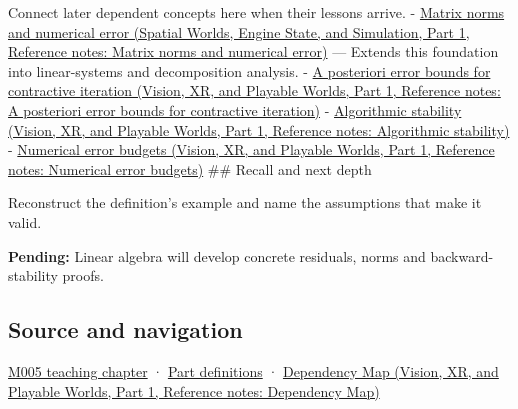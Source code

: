\hypertarget{appendix-a7fbaf6d1b1c-used-by}{}

Connect later dependent concepts here when their lessons arrive. - \href{../05-Spatial-Worlds-Engine-State-and-Simulation-P01/main.pdf\#nameddest=appendix-f8657bac66e5}{Matrix norms and numerical error (Spatial Worlds, Engine State, and Simulation, Part 1, Reference notes: Matrix norms and numerical error)} --- Extends this foundation into linear-systems and decomposition analysis. - \href{../07-Vision-XR-and-Playable-Worlds-P01/main.pdf\#nameddest=appendix-d83b0ad1be7f}{A posteriori error bounds for contractive iteration (Vision, XR, and Playable Worlds, Part 1, Reference notes: A posteriori error bounds for contractive iteration)} - \href{../07-Vision-XR-and-Playable-Worlds-P01/main.pdf\#nameddest=appendix-aa2bf0d79639}{Algorithmic stability (Vision, XR, and Playable Worlds, Part 1, Reference notes: Algorithmic stability)} - \href{../07-Vision-XR-and-Playable-Worlds-P01/main.pdf\#nameddest=appendix-31b8c295e05f}{Numerical error budgets (Vision, XR, and Playable Worlds, Part 1, Reference notes: Numerical error budgets)} \#\# Recall and next depth

Reconstruct the definition's example and name the assumptions that make it valid.

\textbf{Pending:} Linear algebra will develop concrete residuals, norms and backward-stability proofs.

\subsection{Source and navigation}\label{appendix-a7fbaf6d1b1c-source-and-navigation}

\hypertarget{appendix-a7fbaf6d1b1c-source-and-navigation}{}

\hyperref[01-foundations-i-ch001-when-arithmetic-meets-uncertainty]{M005 teaching chapter} · \hyperref[appendix-fd090d982a15-m005---parts-77-88]{Part definitions} · \href{../07-Vision-XR-and-Playable-Worlds-P01/main.pdf\#nameddest=appendix-4ad47bdd269a}{Dependency Map (Vision, XR, and Playable Worlds, Part 1, Reference notes: Dependency Map)}
